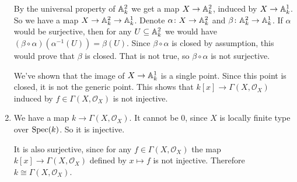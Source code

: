 \begin{exercise}{3}
\begin{enumerate}
{                By the universal property of $\mathbb{A}^2_k$ we get a map $X \to
                \mathbb{A}^2_k$, induced by $X \to \mathbb{A}^1_k$.
                So we have a map $X \to \mathbb{A}^2_k \to \mathbb{A}^1_k$.
                Denote $\alpha \colon X \to \mathbb{A}^2_k$ and $\beta \colon \mathbb{A}^2_k
                \to \mathbb{A}^1_k$.
                If $\alpha$ would be surjective, then for any $U \subseteq
                \mathbb{A}^2_k$ we would have $(\beta \circ \alpha)(\alpha^{-1}(U)) =
                \beta(U)$. Since $\beta \circ \alpha$ is closed by assumption,
                this would prove that $\beta$ is closed. That is not true, so
                $\beta \circ \alpha$ is not surjective.

                We've shown that the image of $X \to \mathbb{A}^1_k$ is a single
                point. Since this point is closed, it is not the generic point.
                This shows that $k[x] \to \Gamma(X, \mathcal{O}_X)$ induced by
                $f \in \Gamma(X, \mathcal{O}_X)$ is not injective.
            }
        \item{
                We have a map $k \to \Gamma(X, \mathcal{O}_X)$. It cannot be
                $0$, since $X$ is locally finite type over $\operatorname{Spec}(k)$. So it is
                injective.

                It is also surjective, since for any $f \in \Gamma(X,
                \mathcal{O}_X)$ the map $k[x] \to \Gamma(X, \mathcal{O}_X)$
                defined by $x \mapsto f$ is not injective. Therefore $k \cong
                \Gamma(X, \mathcal{O}_X)$.
            }
    \end{enumerate}
\end{exercise}


